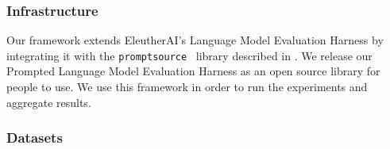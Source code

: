 \documentclass[twoside,11pt]{article}
\begin{document}
\begin{table}[ht!]
    \centering\small
    \caption{Four prompts for the WMT'14 dataset \citep{bojar-etal-2014-findings} for MT evaluation. Above, ``L1'' and ``L2'' are~ replaced with language names (e.g.~``Bengali'' and ``Russian'').}
    \label{tab:prompt-examples}
\end{table}

\subsubsection{Infrastructure} 
Our framework extends EleutherAI's Language Model Evaluation Harness \citep{eval-harness} by integrating it with the \texttt{promptsource}~\citep{bach2022promptsource} library described in . We release our Prompted Language Model Evaluation Harness 
as an open source library for people to use.
We use this framework in order to run the experiments and aggregate results.

\subsubsection{Datasets} 
\end{document}
